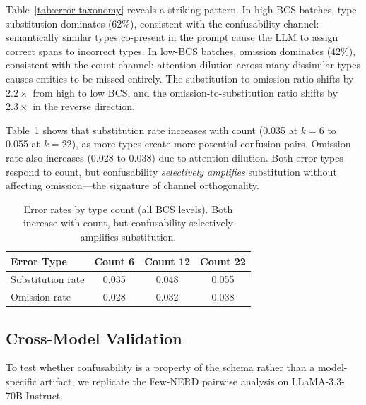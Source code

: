\documentclass[11pt,a4paper]{article}
\begin{document}
Table~\ref{tab:error-taxonomy} reveals a striking pattern.
In high-BCS batches, type substitution dominates (62\%), consistent with the confusability channel: semantically similar types co-present in the prompt cause the LLM to assign correct spans to incorrect types.
In low-BCS batches, omission dominates (42\%), consistent with the count channel: attention dilution across many dissimilar types causes entities to be missed entirely.
The substitution-to-omission ratio shifts by $2.2\times$ from high to low BCS, and the omission-to-substitution ratio shifts by $2.3\times$ in the reverse direction.

Table~\ref{tab:error-by-count} shows that substitution rate increases with count (0.035 at $k{=}6$ to 0.055 at $k{=}22$), as more types create more potential confusion pairs.
Omission rate also increases (0.028 to 0.038) due to attention dilution.
Both error types respond to count, but confusability \emph{selectively amplifies} substitution without affecting omission---the signature of channel orthogonality.

\begin{table}[t]
\centering
\small
\begin{tabular}{lccc}
\toprule
\textbf{Error Type} & \textbf{Count 6} & \textbf{Count 12} & \textbf{Count 22} \\
\midrule
Substitution rate & 0.035 & 0.048 & 0.055 \\
Omission rate     & 0.028 & 0.032 & 0.038 \\
\bottomrule
\end{tabular}
\caption{Error rates by type count (all BCS levels). Both increase with count, but confusability selectively amplifies substitution.}
\label{tab:error-by-count}
\end{table}


\subsection{Cross-Model Validation}
\label{sec:cross-model}

To test whether confusability is a property of the schema rather than a model-specific artifact, we replicate the Few-NERD pairwise analysis on LLaMA-3.3-70B-Instruct.
\end{document}
